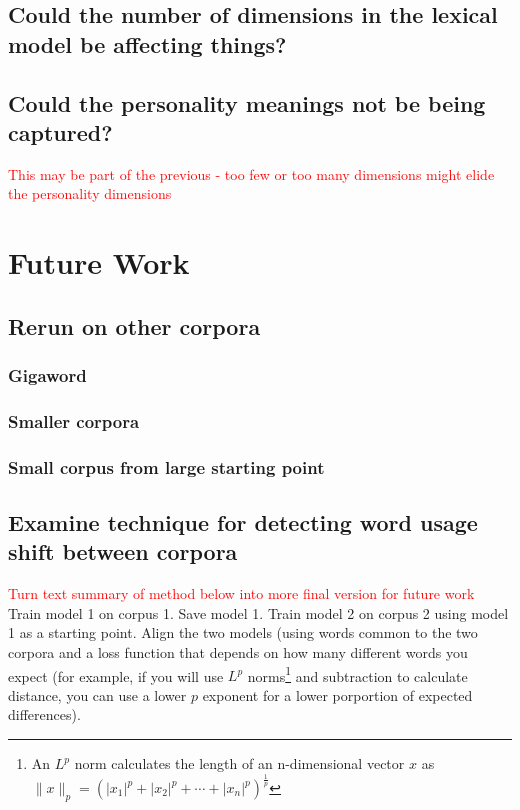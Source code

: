 \documentclass[10pt,letterpaper]{book}
\newcommand{\todo}[1]{\textcolor{red}{#1}}
\begin{document}
\section{Could the number of dimensions in the lexical model be affecting things?}

\section{Could the personality meanings not be being captured?}

\todo{This may be part of the previous - too few or too many dimensions might elide the personality dimensions}

\chapter{Future Work}

\section{Rerun on other corpora}

\subsection{Gigaword}
\subsection{Smaller corpora}
\subsection{Small corpus from large starting point}

\section{Examine technique for detecting word usage shift between corpora}

\todo{Turn text summary of method below into more final version for future work}
Train model 1 on corpus 1. Save model 1. Train model 2 on corpus 2 using model 1 as a starting point. Align the two models (using words common to the two corpora and a loss function that depends on how many different words you expect (for example, if you will use $L^p$ norms\footnote{An $L^p$ norm calculates the length of an n-dimensional vector $x$ as $\|x\|_p=\left(|x_1|^p+|x_2|^p+\dotsb+|x_n|^p\right)^{\frac{1}{p}}$} and subtraction to calculate distance, you can use a lower $p$ exponent for a lower porportion of expected differences).
\end{document}
